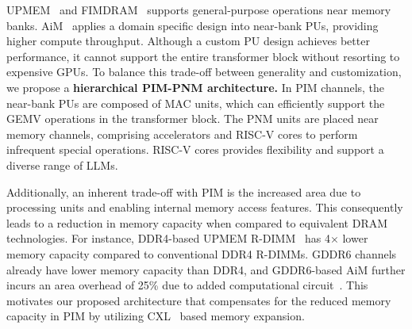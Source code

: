 





UPMEM~\cite{upmem} and FIMDRAM~\cite{fimdram} supports general-purpose operations near memory banks. AiM~\cite{aim1, aim2} applies a domain specific design into near-bank PUs, providing higher compute throughput. Although a custom PU design achieves better performance, it cannot support the entire transformer block without resorting to expensive GPUs.
To balance this trade-off between generality and customization, we propose a \textbf{hierarchical PIM-PNM architecture.} In PIM channels, the near-bank PUs are composed of MAC units, which can efficiently support the GEMV operations in the transformer block. The PNM units are placed near memory channels, comprising accelerators and RISC-V cores to perform infrequent special operations. RISC-V cores provides flexibility and support a diverse range of LLMs. 


Additionally, an inherent trade-off with PIM is the increased area due to processing units and enabling internal memory access features. This consequently leads to a reduction in memory capacity when compared to equivalent DRAM technologies. For instance, 
DDR4-based UPMEM R-DIMM~\cite{upmem} has 4$\times$ lower memory capacity compared to conventional DDR4 R-DIMMs. 
GDDR6 channels already have lower memory capacity than DDR4, and GDDR6-based AiM further incurs an area overhead of 25\% due to added computational circuit~\cite{aim2}. 
This motivates our proposed architecture that compensates for the reduced memory capacity in PIM by utilizing CXL~\cite{sharma2022compute} based memory expansion. 

